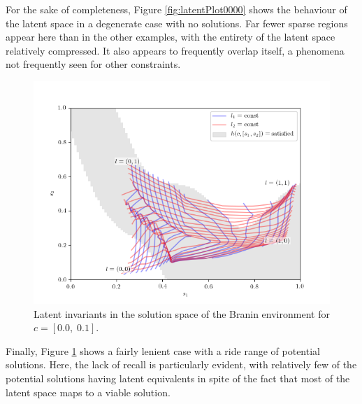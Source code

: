 \documentclass[../../main.tex]{subfiles}
\begin{document}
For the sake of completeness, Figure \ref{fig:latentPlot0000} shows the behaviour of the latent space in a degenerate case with no solutions.
Far fewer sparse regions appear here than in the other examples, with the entirety of the latent space relatively compressed.
It also appears to frequently overlap itself, a phenomena not frequently seen for other constraints.
\begin{figure}[H]
    \begin{center}
    \includegraphics[width=\textwidth]{latentPlot0001}
    \caption{
        Latent invariants in the solution space of the Branin environment for $c=[0.0,\;0.1]$.
    }
    \label{fig:latentPlot0001}
    \end{center}
\end{figure}
Finally, Figure \ref{fig:latentPlot0001} shows a fairly lenient case with a ride range of potential solutions.
Here, the lack of recall is particularly evident, with relatively few of the potential solutions having latent equivalents in spite of the fact that most of the latent space maps to a viable solution.
\end{document}

